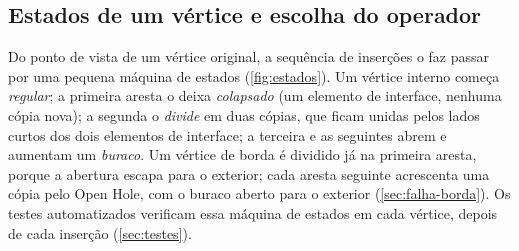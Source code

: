 \subsection{Estados de um vértice e escolha do operador}
\label{sec:estados}

Do ponto de vista de um vértice original, a sequência de inserções o faz passar por uma pequena máquina de estados
(\cref{fig:estados}). Um vértice interno começa \emph{regular}; a primeira aresta o deixa \emph{colapsado} (um elemento
de interface, nenhuma cópia nova); a segunda o \emph{divide} em duas cópias, que ficam unidas pelos lados curtos dos
dois elementos de interface; a terceira e as seguintes abrem e aumentam um \emph{buraco}. Um vértice de borda é
dividido já na primeira aresta, porque a abertura escapa para o exterior; cada aresta seguinte acrescenta uma cópia pelo
Open Hole, com o buraco aberto para o exterior (\cref{sec:falha-borda}). Os testes automatizados verificam essa máquina
de estados em cada vértice, depois de cada inserção (\cref{sec:testes}).

